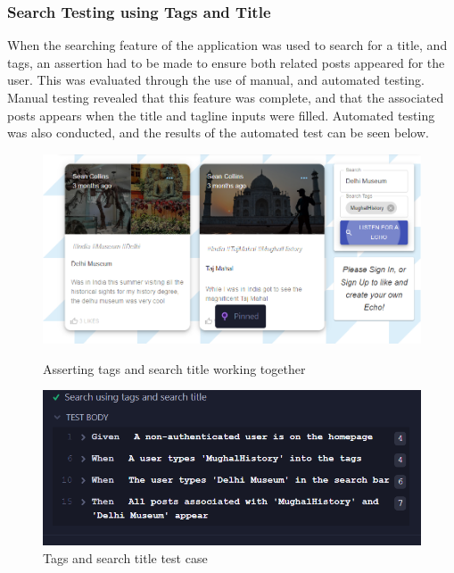 \subsubsection{Search Testing using Tags and Title}
When the searching feature of the application was used to search for a title, and tags, an assertion had to be made to ensure both related posts appeared for the user. This was evaluated through the use of manual, and automated testing. Manual testing revealed that this feature was complete, and that the associated posts appears when the title and tagline inputs were filled. Automated testing was also conducted, and the results of the automated test can be seen below.
\begin{figure}[ht]
    \hspace{0.5cm}
    \begin{minipage}[b]{0.3\linewidth}
    \centering
   \includegraphics[width=\linewidth]{images/TagAndTitleSearch}
    \caption{Asserting tags and search title working together}
    \label{image:TagAndTitleSearch}
\end{minipage}
    \hspace{0.5cm}
    \begin{minipage}[b]{0.5\linewidth}
    \centering
   \includegraphics[width=\linewidth]{images/TagAndTitleSearchTestCase}
    \caption{Tags and search title test case}
    \label{image:TagAndTitleSearchTestCase}
\end{minipage}
\end{figure}

